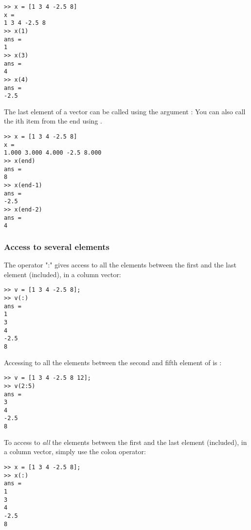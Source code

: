 \begin{lstlisting}
>> x = [1 3 4 -2.5 8]
x = 
1 3 4 -2.5 8
>> x(1)
ans = 
1
>> x(3)
ans = 
4
>> x(4)
ans = 
-2.5
\end{lstlisting}




The last element of a vector can be called using the argument :
You can also call the ith item from the end using . 
\begin{lstlisting}
>> x = [1 3 4 -2.5 8]
x = 
1.000 3.000 4.000 -2.5 8.000
>> x(end)
ans = 
8
>> x(end-1)
ans = 
-2.5
>> x(end-2)
ans = 
4
\end{lstlisting}



\subsubsection{Access to several elements}

The operator ":" gives access to all the elements between the first and the last element (included), in a column vector:

\begin{lstlisting}
>> v = [1 3 4 -2.5 8];
>> v(:)
ans = 
1
3
4
-2.5
8
\end{lstlisting}

Accessing to all the elements between the second and fifth element of  is :

\begin{lstlisting}
>> v = [1 3 4 -2.5 8 12];
>> v(2:5)
ans = 
3
4
-2.5
8
\end{lstlisting}
To access to \emph{all} the elements between the first and the last element (included), in a column vector, simply use the colon operator:

\begin{lstlisting}
>> x = [1 3 4 -2.5 8];
>> x(:)
ans = 
1
3
4
-2.5
8
\end{lstlisting}




